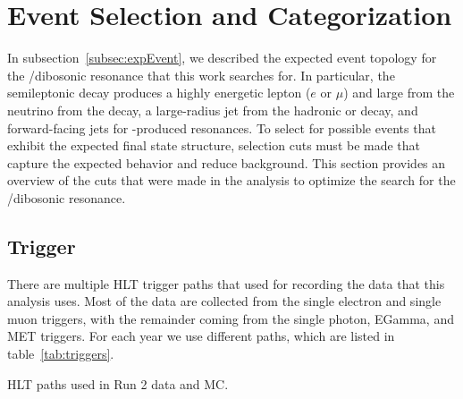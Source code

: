 
\section{Event Selection and Categorization}
\label{sec:events}

In subsection~\ref{subsec:expEvent}, we described the expected event topology for the \WV/\WH dibosonic resonance that this work searches for.
In particular, the semileptonic decay produces a highly energetic lepton ($e$ or $\mu$) and large \Etmiss from the neutrino from the \Wtolnu decay, a large-radius jet from the hadronic \Vtoqqbarpr or \Htobbbar decay, and forward-facing \VBF jets for \VBF-produced resonances.
To select for possible events that exhibit the expected final state structure, selection cuts must be made that capture the expected behavior and reduce background.
This section provides an overview of the cuts that were made in the analysis to optimize the search for the \WV/\WH dibosonic resonance.

\subsection{Trigger}

There are multiple HLT trigger paths that used for recording the data that this analysis uses.
Most of the data are collected from the single electron and single muon triggers, with the remainder coming from the single photon, EGamma, and MET triggers.
For each year we use different paths, which are listed in table~\ref{tab:triggers}.%

\begin{table}[htbp]
  \centering
  
  \caption{
    HLT paths used in Run 2 data and MC.
  }
  \label{tab:triggers}
\end{table}

%  

%  

